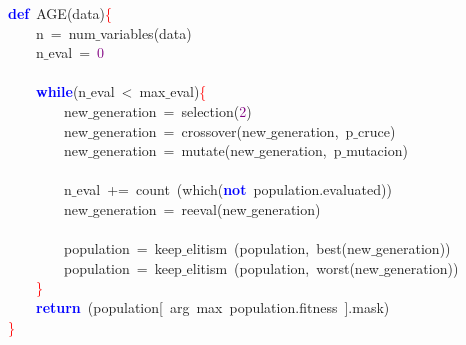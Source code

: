 \noindent
\mbox{}\textbf{\textcolor{Blue}{def}}\ AGE\textcolor{BrickRed}{(}data\textcolor{BrickRed}{)}\textcolor{Red}{\{} \\
\mbox{}\ \ \ \ n\ \textcolor{BrickRed}{=}\ num$\_$variables\textcolor{BrickRed}{(}data\textcolor{BrickRed}{)} \\
\mbox{}\ \ \ \ n$\_$eval\ \textcolor{BrickRed}{=}\ \textcolor{Purple}{0} \\
\mbox{} \\
\mbox{}\ \ \ \ \textbf{\textcolor{Blue}{while}}\textcolor{BrickRed}{(}n$\_$eval\ \textcolor{BrickRed}{\textless{}}\ max$\_$eval\textcolor{BrickRed}{)}\textcolor{Red}{\{} \\
\mbox{}\ \ \ \ \ \ \ \ new$\_$generation\ \textcolor{BrickRed}{=}\ selection\textcolor{BrickRed}{(}\textcolor{Purple}{2}\textcolor{BrickRed}{)} \\
\mbox{}\ \ \ \ \ \ \ \ new$\_$generation\ \textcolor{BrickRed}{=}\ crossover\textcolor{BrickRed}{(}new$\_$generation\textcolor{BrickRed}{,}\ p$\_$cruce\textcolor{BrickRed}{)} \\
\mbox{}\ \ \ \ \ \ \ \ new$\_$generation\ \textcolor{BrickRed}{=}\ mutate\textcolor{BrickRed}{(}new$\_$generation\textcolor{BrickRed}{,}\ p$\_$mutacion\textcolor{BrickRed}{)} \\
\mbox{} \\
\mbox{}\ \ \ \ \ \ \ \ n$\_$eval\ \textcolor{BrickRed}{+=}\ count\ \textcolor{BrickRed}{(}which\textcolor{BrickRed}{(}\textbf{\textcolor{Blue}{not}}\ population\textcolor{BrickRed}{.}evaluated\textcolor{BrickRed}{))} \\
\mbox{}\ \ \ \ \ \ \ \ new$\_$generation\ \textcolor{BrickRed}{=}\ reeval\textcolor{BrickRed}{(}new$\_$generation\textcolor{BrickRed}{)} \\
\mbox{} \\
\mbox{}\ \ \ \ \ \ \ \ population\ \textcolor{BrickRed}{=}\ keep$\_$elitism\ \textcolor{BrickRed}{(}population\textcolor{BrickRed}{,}\ best\textcolor{BrickRed}{(}new$\_$generation\textcolor{BrickRed}{))} \\
\mbox{}\ \ \ \ \ \ \ \ population\ \textcolor{BrickRed}{=}\ keep$\_$elitism\ \textcolor{BrickRed}{(}population\textcolor{BrickRed}{,}\ worst\textcolor{BrickRed}{(}new$\_$generation\textcolor{BrickRed}{))} \\
\mbox{}\ \ \ \ \textcolor{Red}{\}} \\
\mbox{}\ \ \ \ \textbf{\textcolor{Blue}{return}}\ \textcolor{BrickRed}{(}population\textcolor{BrickRed}{[}\ arg\ max\ population\textcolor{BrickRed}{.}fitness\ \textcolor{BrickRed}{].}mask\textcolor{BrickRed}{)} \\
\mbox{}\textcolor{Red}{\}} \\
\mbox{}
